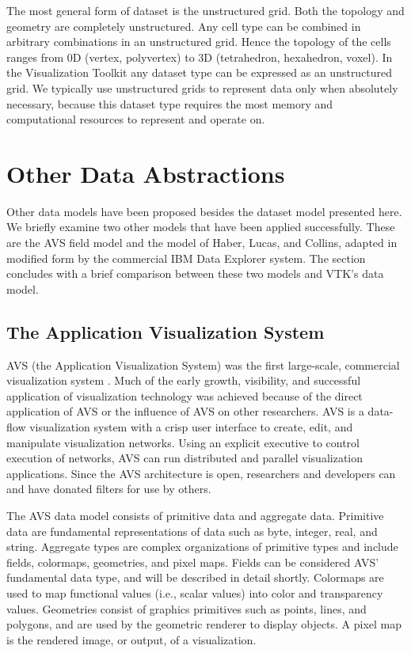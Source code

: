 The most general form of dataset is the unstructured grid. Both the topology and geometry are completely unstructured. Any cell type can be combined in arbitrary combinations in an unstructured grid. Hence the topology of the cells ranges from 0D (vertex, polyvertex) to 3D (tetrahedron, hexahedron, voxel). In the Visualization Toolkit any dataset type can be expressed as an unstructured grid. We typically use unstructured grids to represent data only when absolutely necessary, because this dataset type requires the most memory and computational resources to represent and operate on.

\section{Other Data Abstractions}

Other data models have been proposed besides the dataset model presented here. We briefly examine two other models that have been applied successfully. These are the AVS field model and the model of Haber, Lucas, and Collins, adapted in modified form by the commercial IBM Data Explorer system. The section concludes with a brief comparison between these two models and VTK’s data model.

\subsection{The Application Visualization System}

AVS (the Application Visualization System) was the first large-scale, commercial visualization system \cite{AVS89}. Much of the early growth, visibility, and successful application of visualization technology was achieved because of the direct application of AVS or the influence of AVS on other researchers. AVS is a data-flow visualization system with a crisp user interface to create, edit, and manipulate visualization networks. Using an explicit executive to control execution of networks, AVS can run distributed and parallel visualization applications. Since the AVS architecture is open, researchers and developers can and have donated filters for use by others.

The AVS data model consists of primitive data and aggregate data. Primitive data are fundamental representations of data such as byte, integer, real, and string. Aggregate types are complex organizations of primitive types and include fields, colormaps, geometries, and pixel maps. Fields can be considered AVS’ fundamental data type, and will be described in detail shortly. Colormaps are used to map functional values (i.e., scalar values) into color and transparency values. Geometries consist of graphics primitives such as points, lines, and polygons, and are used by the geometric renderer to display objects. A pixel map is the rendered image, or output, of a visualization.

